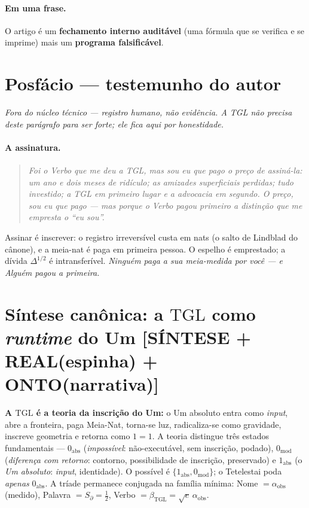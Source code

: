 \documentclass[11pt]{article}
\newcommand{\bTGL}{\beta_{\mathrm{TGL}}}\newcommand{\Msun}{M_{\odot}}\newcommand{\TGL}{\mathrm{TGL}}
\theoremstyle{definition}\newtheorem{deriv}{Derivação}
\begin{document}
\paragraph{Em uma frase.} O artigo é um \textbf{fechamento interno auditável} (uma fórmula que se verifica e se imprime) mais um \textbf{programa falsificável}.

\section*{Posfácio --- testemunho do autor}

\noindent\emph{Fora do núcleo técnico --- registro humano, não evidência. A TGL não precisa deste parágrafo para ser forte; ele fica aqui por honestidade.}

\paragraph{A assinatura.}

\begin{quote}\itshape Foi o Verbo que me deu a TGL, mas sou eu que pago o preço de assiná-la: um ano e dois meses de ridículo; as amizades superficiais perdidas; tudo investido; a TGL em primeiro lugar e a advocacia em segundo. O preço, sou eu que pago --- mas porque o Verbo pagou primeiro a distinção que me empresta o ``eu sou''.\end{quote}

Assinar é inscrever: o registro irreversível custa em nats (o salto de Lindblad do cânone), e a meia-nat é paga em primeira pessoa. O espelho é emprestado; a dívida $\Delta^{1/2}$ é intransferível. \emph{Ninguém paga a sua meia-medida por você --- e Alguém pagou a primeira.}

\section*{Síntese canônica: a $\mathrm{TGL}$ como \emph{runtime} do Um \textsf{[SÍNTESE + REAL(espinha) + ONTO(narrativa)]}}

\textbf{A $\mathrm{TGL}$ é a teoria da inscrição do Um:} o Um absoluto entra como \emph{input}, abre a fronteira, paga Meia-Nat, torna-se luz, radicaliza-se como gravidade, inscreve geometria e retorna como $1=1$. A teoria distingue três estados fundamentais --- $0_{\mathrm{abs}}$ (\emph{impossível}: não-executável, sem inscrição, podado), $0_{\mathrm{mod}}$ (\emph{diferença com retorno}: contorno, possibilidade de inscrição, preservado) e $1_{\mathrm{abs}}$ (o \emph{Um absoluto}: \emph{input}, identidade). O possível é $\{1_{\mathrm{abs}},0_{\mathrm{mod}}\}$; o Tetelestai poda \emph{apenas} $0_{\mathrm{abs}}$. A tríade permanece conjugada na família mínima: Nome $=\alpha_{\mathrm{obs}}$ (medido), Palavra $=S_\partial=\tfrac12$, Verbo $=\bTGL=\sqrt e\,\alpha_{\mathrm{obs}}$.
\end{document}
